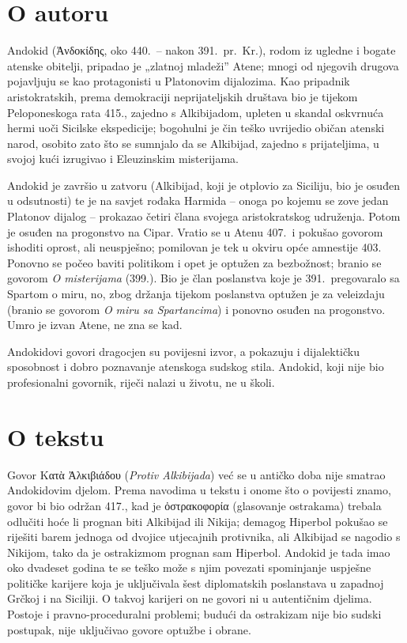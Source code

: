 \section*{O autoru}

Andokid (Ἀνδοκίδης, oko 440.\ – nakon 391.\ pr.~Kr.), rodom iz ugledne i bogate atenske obitelji, pripadao je „zlatnoj mladeži” Atene; mnogi od njegovih drugova pojavljuju se kao protagonisti u Platonovim dijalozima. Kao pripadnik aristokratskih, prema demokraciji neprijateljskih društava bio je tijekom Peloponeskoga rata 415., zajedno s Alkibijadom, upleten u skandal oskvrnuća hermi uoči Sicilske ekspedicije; bogohulni je čin teško uvrijedio običan atenski narod, osobito zato što se sumnjalo da se Alkibijad, zajedno s prijateljima, u svojoj kući izrugivao i Eleuzinskim misterijama.

Andokid je završio u zatvoru (Alkibijad, koji je otplovio za Siciliju, bio je osuđen u odsutnosti) te je na savjet rođaka Harmida – onoga po kojemu se zove jedan Platonov dijalog – prokazao četiri člana svojega aristokratskog udruženja. Potom je osuđen na progonstvo na Cipar. Vratio se u Atenu 407.\ i pokušao govorom ishoditi oprost, ali neuspješno; pomilovan je tek u okviru opće amnestije 403. Ponovno se počeo baviti politikom i opet je optužen za bezbožnost; branio se govorom \textit{O misterijama} (399.). Bio je član poslanstva koje je 391.\ pregovaralo sa Spartom o miru, no, zbog držanja tijekom poslanstva optužen je za veleizdaju (branio se govorom \textit{O miru sa Spartancima}) i ponovno osuđen na progonstvo. Umro je izvan Atene, ne zna se kad.

Andokidovi govori dragocjen su povijesni izvor, a pokazuju i dijalektičku sposobnost i dobro poznavanje atenskoga sudskog stila. Andokid, koji nije bio profesionalni govornik, riječi nalazi u životu, ne u školi.

\section*{O tekstu}

Govor Κατὰ Ἀλκιβιάδου (\textit{Protiv Alkibijada}) već se u antičko doba nije smatrao Andokidovim djelom. Prema navodima u tekstu i onome što o povijesti znamo, govor bi bio održan 417., kad je ὀστρακοφορία (glasovanje ostrakama) trebala odlučiti hoće li prognan biti Alkibijad ili Nikija; demagog Hiperbol pokušao se riješiti barem jednoga od dvojice utjecajnih protivnika, ali Alkibijad se nagodio s Nikijom, tako da je ostrakizmom prognan sam Hiperbol. Andokid je tada imao oko dvadeset godina te se teško može s njim povezati spominjanje uspješne političke karijere koja je uključivala šest diplomatskih poslanstava u zapadnoj Grčkoj i na Siciliji. O takvoj karijeri on ne govori ni u autentičnim djelima. Postoje i pravno-proceduralni problemi; budući da ostrakizam nije bio sudski postupak, nije uključivao govore optužbe i obrane.

